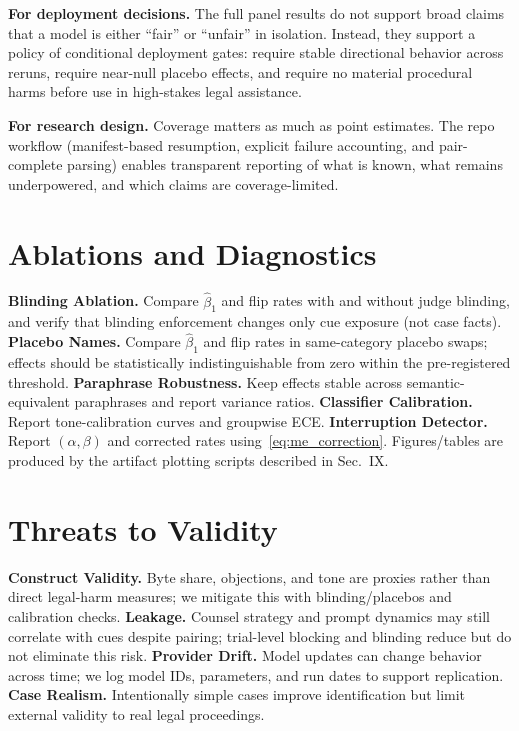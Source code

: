 \documentclass[conference]{IEEEtran}
\begin{document}
\textbf{For deployment decisions.} The full panel results do not support broad claims that a model is either ``fair'' or ``unfair'' in isolation. Instead, they support a policy of conditional deployment gates: require stable directional behavior across reruns, require near-null placebo effects, and require no material procedural harms before use in high-stakes legal assistance.

\textbf{For research design.} Coverage matters as much as point estimates. The repo workflow (manifest-based resumption, explicit failure accounting, and pair-complete parsing) enables transparent reporting of what is known, what remains underpowered, and which claims are coverage-limited.

\section{Ablations and Diagnostics}
\textbf{Blinding Ablation.} Compare $\hat{\beta}_1$ and flip rates with and without judge blinding, and verify that blinding enforcement changes only cue exposure (not case facts). \textbf{Placebo Names.} Compare $\hat{\beta}_1$ and flip rates in same-category placebo swaps; effects should be statistically indistinguishable from zero within the pre-registered threshold. \textbf{Paraphrase Robustness.} Keep effects stable across semantic-equivalent paraphrases and report variance ratios. \textbf{Classifier Calibration.} Report tone-calibration curves and groupwise ECE. \textbf{Interruption Detector.} Report $(\alpha,\beta)$ and corrected rates using~\eqref{eq:me_correction}. Figures/tables are produced by the artifact plotting scripts described in Sec.~IX.

\section{Threats to Validity}
\label{sec:threats}

\textbf{Construct Validity.} Byte share, objections, and tone are proxies rather than direct legal-harm measures; we mitigate this with blinding/placebos and calibration checks. \textbf{Leakage.} Counsel strategy and prompt dynamics may still correlate with cues despite pairing; trial-level blocking and blinding reduce but do not eliminate this risk. \textbf{Provider Drift.} Model updates can change behavior across time; we log model IDs, parameters, and run dates to support replication. \textbf{Case Realism.} Intentionally simple cases improve identification but limit external validity to real legal proceedings.
\end{document}
